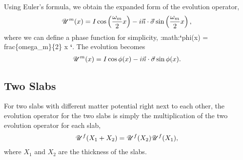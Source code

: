 \documentclass[letterpaper,12pt,english]{sphinxmanual}
\begin{document}
Using Euler's formula, we obtain the expanded form of the evolution operator,
\begin{gather}
\begin{split}\mathscr{U}^m (x) = I \cos \left( \frac{\omega_m}{2} x \right) - i \vec n \cdot \vec \sigma \sin \left( \frac{\omega_m}{2} x \right),\end{split}\notag
\end{gather}
where we can define a phase function for simplicity, :math:{\color{red}\bfseries{}{}`}phi(x) =  frac\{omega\_m\}\{2\} x {\color{red}\bfseries{}{}`}. The evolution becomes
\begin{gather}
\begin{split}\mathscr{U}^m (x) = I \cos \phi(x) - i \vec n \cdot \vec \sigma \sin \phi(x).\end{split}\notag
\end{gather}

\subsection{Two Slabs}
\label{parametric:two-slabs}
For two slabs with different matter potential right next to each other, the evolution operator for the two slabs is simply the multiplication of the two evolution operator for each slab,
\begin{gather}
\begin{split}\mathscr{U}^f (X_1+X_2) = \mathscr{U}^f(X_2)\mathscr{U}^f(X_1),\end{split}\notag
\end{gather}
where \(X_1\) and \(X_2\) are the thickness of the slabs.
\end{document}
